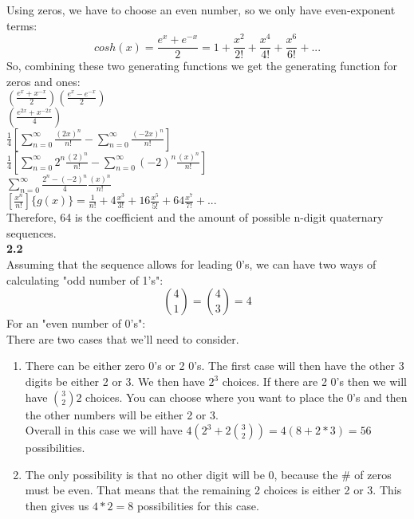 \documentclass[10pt,a4paper]{report}
\begin{document}
	Using zeros, we have to choose an even number, so we only have even-exponent terms:\\
	\[cosh(x) = \frac{e^x + e^{-x}}{2} = 1 + \frac{x^2}{2!} + \frac{x^4}{4!} + \frac{x^6}{6!} + ...\]
	So, combining these two generating functions we get the generating function for zeros and ones:\\
	$(\frac{e^x + x^{-x}}{2})(\frac{e^x - e^{-x}}{2}) $\\
	$(\frac{e^{2x} + x^{-2x}}{4})$\\
	$\frac{1}{4}[\sum_{n=0}^{\infty}\frac{(2x)^n}{n!} - \sum_{n=0}^{\infty}\frac{(-2x)^n}{n!}]$\\
	$\frac{1}{4}[\sum_{n=0}^{\infty}2^n\frac{(2)^n}{n!} - \sum_{n=0}^{\infty}(-2)^n\frac{(x)^n}{n!}]$\\
	$\sum_{n=0}^{\infty}\frac{2^n-(-2)^n}{4}\frac{(x)^n}{n!}$\\
	$[\frac{x^n}{n!}]\{g(x)\} = \frac{1}{n!} + 4\frac{x^3}{3!} + 16\frac{x^5}{5!} + 64\frac{x^7}{7!} + ...$\\
	Therefore, 64 is the coefficient and the amount of possible n-digit quaternary sequences.\\
	\newline
	\textbf{2.2}\\
	Assuming that the sequence allows for leading 0's, we can have two ways of calculating "odd number of 1's":
	\[\binom{4}{1} = \binom{4}{3} = 4\]
	For an "even number of 0's":\\
	There are two cases that we'll need to consider.
	\begin{enumerate}
		\item There can be either zero 0's or 2 0's.  The first case will then have the other 3 digits be either 2 or 3.  We then have $2^3$ choices.  If there are 2 0's then we will have $\binom{3}{2}2$ choices.  You can choose where you want to place the 0's and then the other numbers will be either 2 or 3.\\
		Overall in this case we will have $4(2^3 + 2\binom{3}{2}) = 4(8 + 2 * 3) = 56$ possibilities.
		\item The only possibility is that no other digit will be 0, because the \# of zeros must be even.  That means that the remaining 2 choices is either 2 or 3.  This then gives us $4 * 2 = 8$ possibilities for this case.\\
	\end{enumerate}
	
\end{document}
